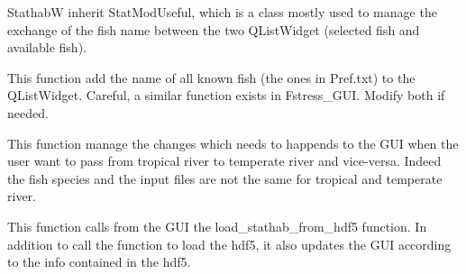 \documentclass[letterpaper,10pt,english]{sphinxmanual}
\begin{document}
\begin{fulllineitems}
StathabW inherit StatModUseful, which is a class mostly used to manage the exchange of the fish name between the
two QListWidget (selected fish and available fish).

\begin{fulllineitems}
\label{\detokenize{index:src_GUI.stathab_GUI.StathabW.add_all_fish}}
This function add the name of all known fish (the ones in Pref.txt) to the QListWidget. Careful,
a similar function exists in Fstress\_GUI. Modify both if needed.

\end{fulllineitems}


\begin{fulllineitems}
\label{\detokenize{index:src_GUI.stathab_GUI.StathabW.change_riv_type}}
This function manage the changes which needs to happends to the GUI when the user want to pass from
tropical river to temperate river and vice-versa. Indeed the fish species and the input files are not
the same for tropical and temperate river.

\end{fulllineitems}


\begin{fulllineitems}
\label{\detokenize{index:src_GUI.stathab_GUI.StathabW.init_iu}}
\end{fulllineitems}


\begin{fulllineitems}
\label{\detokenize{index:src_GUI.stathab_GUI.StathabW.load_from_hdf5_gui}}
This function calls from the GUI the load\_stathab\_from\_hdf5 function. In addition to call the function to load
the hdf5, it also updates the GUI according to the info contained in the hdf5.



\end{fulllineitems}
\end{fulllineitems}
\end{document}
